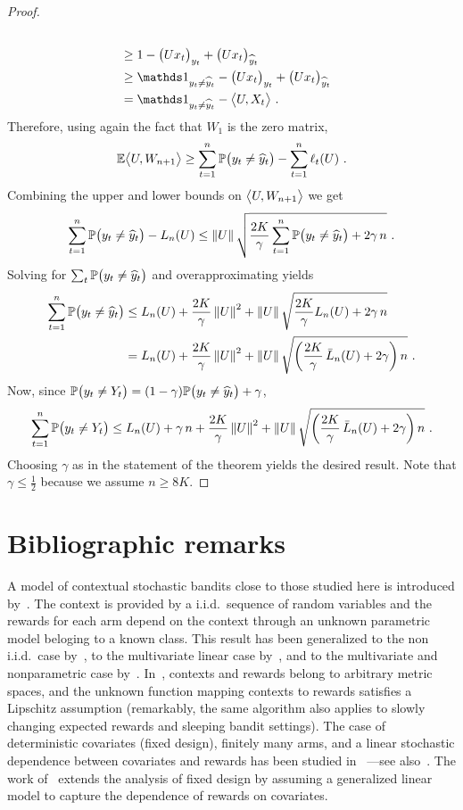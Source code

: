 \begin{proof}
\begin{align*}
\\ &\ge
    1 - \bigl(Ux_t\bigr)_{y_t} + \bigl(Ux_t\bigr)_{\yhat_t}
\\ &\ge
    \ds1_{y_t \neq \yhat_t} - \bigl(Ux_t\bigr)_{y_t} + \bigl(Ux_t\bigr)_{\yhat_t}
\\ &=
    \ds1_{y_t \neq \yhat_t} - \inner{U}{X_t}~.
\end{align*}
Therefore, using again the fact that $W_1$ is the zero matrix,
\[
    \mathbb{E}\bigl\langle{U},{W_{n+1}}\bigr\rangle \ge \sum_{t=1}^n \mathbb{P}\bigl(y_t \neq \widehat{y}_t\bigr) - \sum_{t=1}^n \ell_t(U)~.
\]
Combining the upper and lower bounds on $\bigl\langle{U},{W_{n+1}}\bigr\rangle$ we get
\[
    \sum_{t=1}^n \mathbb{P}\bigl(y_t \neq \widehat{y}_t\bigr) - L_n(U)
\le
    \left\|{U}\right\|\sqrt{\frac{2K}{\gamma}\sum_{t=1}^n \mathbb{P}\bigl(y_t \neq \widehat{y}_t\bigr) + 2\gamma\,n}~.
\]
Solving for $\sum_t \mathbb{P}\bigl(y_t \neq \widehat{y}_t\bigr)$ and overapproximating yields
\begin{align*}
    \sum_{t=1}^n \mathbb{P}\bigl(y_t \neq \widehat{y}_t\bigr)
&\le
    L_n(U) + \frac{2K}{\gamma}\left\|{U}\right\|^2 + \left\|{U}\right\|\sqrt{\frac{2K}{\gamma} L_n(U) + 2\gamma\,n}
\\ &=
    L_n(U) + \frac{2K}{\gamma}\left\|{U}\right\|^2 + \left\|{U}\right\|\sqrt{\left(\frac{2K}{\gamma}\,\bar{L}_n(U) + 2\gamma\right)n}~.
\end{align*}
Now, since $\mathbb{P}\bigl(y_t \neq Y_t\bigr) = (1-\gamma)\mathbb{P}\bigl(y_t \neq \widehat{y}_t\bigr) + \gamma$,
\[
    \sum_{t=1}^n \mathbb{P}\bigl(y_t \neq Y_t\bigr)
\le
    L_n(U) + \gamma\,n + \frac{2K}{\gamma}\left\|{U}\right\|^2 + \left\|{U}\right\|\sqrt{\left(\frac{2K}{\gamma}\,\bar{L}_n(U) + 2\gamma\right)n}~.
\]
Choosing $\gamma$ as in the statement of the theorem yields the desired result.
Note that $\gamma \le \tfrac{1}{2}$ because we assume $n \ge 8K$.
\end{proof}


\section{Bibliographic remarks} \label{sec:contextual}
%
A model of contextual stochastic bandits close to those studied here is introduced by~\cite{wang2005bandit}. The context is provided by a i.i.d.\ sequence of random variables and the rewards for each arm depend on the context through an unknown parametric model beloging to a known class. This result has been generalized to the non i.i.d.\ case by~\cite{wang2005arbitrary}, to the multivariate linear case by~\cite{RT10}, and to the multivariate and nonparametric case by~\cite{PR11}. In~\cite{slivkins2009contextual}, contexts and rewards belong to arbitrary metric spaces, and the unknown function mapping contexts to rewards satisfies a Lipschitz assumption (remarkably, the same algorithm also applies to slowly changing expected rewards and sleeping bandit settings). The case of deterministic covariates (fixed design), finitely many arms, and a linear stochastic dependence between covariates and rewards has been studied in~\cite{Aue02,chu2011contextual} ---see also~\cite{abe1999associative}. The work of~\cite{filippi2010parametric} extends the analysis of fixed design by assuming a generalized linear model to capture the dependence of rewards on covariates.

